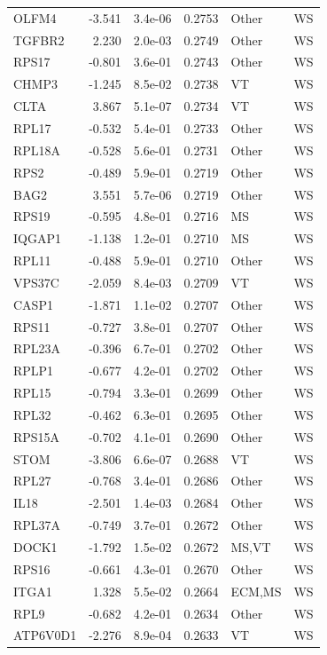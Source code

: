 \begin{table}[ht]
\begin{tabular}{lrlrll}
  OLFM4 & -3.541 & 3.4e-06 & 0.2753 & Other & WS \\ 
  TGFBR2 & 2.230 & 2.0e-03 & 0.2749 & Other & WS \\ 
  RPS17 & -0.801 & 3.6e-01 & 0.2743 & Other & WS \\ 
  CHMP3 & -1.245 & 8.5e-02 & 0.2738 & VT & WS \\ 
  CLTA & 3.867 & 5.1e-07 & 0.2734 & VT & WS \\ 
  RPL17 & -0.532 & 5.4e-01 & 0.2733 & Other & WS \\ 
  RPL18A & -0.528 & 5.6e-01 & 0.2731 & Other & WS \\ 
  RPS2 & -0.489 & 5.9e-01 & 0.2719 & Other & WS \\ 
  BAG2 & 3.551 & 5.7e-06 & 0.2719 & Other & WS \\ 
  RPS19 & -0.595 & 4.8e-01 & 0.2716 & MS & WS \\ 
  IQGAP1 & -1.138 & 1.2e-01 & 0.2710 & MS & WS \\ 
  RPL11 & -0.488 & 5.9e-01 & 0.2710 & Other & WS \\ 
  VPS37C & -2.059 & 8.4e-03 & 0.2709 & VT & WS \\ 
  CASP1 & -1.871 & 1.1e-02 & 0.2707 & Other & WS \\ 
  RPS11 & -0.727 & 3.8e-01 & 0.2707 & Other & WS \\ 
  RPL23A & -0.396 & 6.7e-01 & 0.2702 & Other & WS \\ 
  RPLP1 & -0.677 & 4.2e-01 & 0.2702 & Other & WS \\ 
  RPL15 & -0.794 & 3.3e-01 & 0.2699 & Other & WS \\ 
  RPL32 & -0.462 & 6.3e-01 & 0.2695 & Other & WS \\ 
  RPS15A & -0.702 & 4.1e-01 & 0.2690 & Other & WS \\ 
  STOM & -3.806 & 6.6e-07 & 0.2688 & VT & WS \\ 
  RPL27 & -0.768 & 3.4e-01 & 0.2686 & Other & WS \\ 
  IL18 & -2.501 & 1.4e-03 & 0.2684 & Other & WS \\ 
  RPL37A & -0.749 & 3.7e-01 & 0.2672 & Other & WS \\ 
  DOCK1 & -1.792 & 1.5e-02 & 0.2672 & MS,VT & WS \\ 
  RPS16 & -0.661 & 4.3e-01 & 0.2670 & Other & WS \\ 
  ITGA1 & 1.328 & 5.5e-02 & 0.2664 & ECM,MS & WS \\ 
  RPL9 & -0.682 & 4.2e-01 & 0.2634 & Other & WS \\ 
  ATP6V0D1 & -2.276 & 8.9e-04 & 0.2633 & VT & WS \\ 

\end{tabular}
\end{table}
